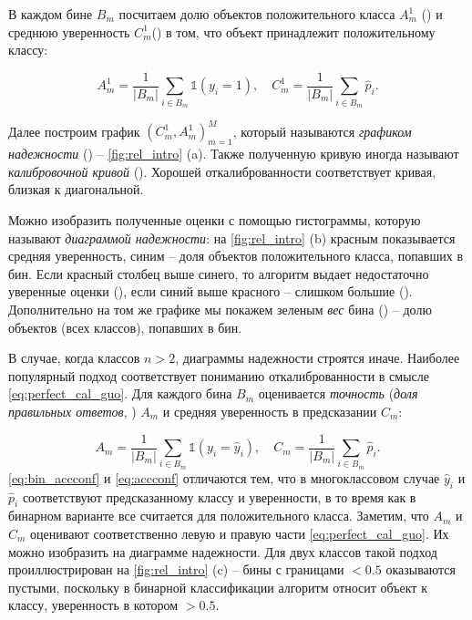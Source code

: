 \documentclass[12pt]{article}
\begin{document}
В каждом бине $B_m$ посчитаем долю объектов положительного класса $A^1_m$ () и среднюю уверенность $C^1_m$() в том, что объект принадлежит положительному классу:

\begin{equation}\label{eq:bin_accconf}
    A^1_m=\frac{1}{|B_m|}\sum_{i\in B_m} \mathbb{1}(y_i=1),
    \quad
    C^1_m=\frac{1}{|B_m|}\sum_{i\in B_m} \hat{p}_i.
\end{equation}

Далее построим график $(C^1_m, A^1_m)_{m=1}^M$, который называются \emph{графиком надежности} \cite{reldiag_idea, good_proba} () -- \autoref{fig:rel_intro} (a). Также полученную кривую иногда называют \emph{калибровочной кривой} (). Хорошей откалиброванности соответствует кривая, близкая к диагональной. 

Можно изобразить полученные оценки с помощью гистограммы, которую называют \emph{диаграммой надежности}: на \autoref{fig:rel_intro} (b) красным показывается средняя уверенность, синим -- доля объектов положительного класса, попавших в бин. Если красный столбец выше синего, то алгоритм выдает недостаточно уверенные оценки (), если синий выше красного -- слишком большие (). Дополнительно на том же графике мы покажем зеленым \emph{вес} бина () -- долю объектов (всех классов), попавших в бин. 

В случае, когда классов $n>2$, диаграммы надежности строятся иначе. Наиболее популярный подход соответствует пониманию откалиброванности в смысле \eqref{eq:perfect_cal_guo}. Для каждого бина $B_m$ оценивается \emph{точность} (\emph{доля правильных ответов}, ) $A_m$ и средняя уверенность в предсказании $C_m$:

\begin{equation}\label{eq:accconf}
    A_m=\frac{1}{|B_m|}\sum_{i\in B_m} \mathbb{1}(y_i=\hat{y}_i),
    \quad
    C_m=\frac{1}{|B_m|}\sum_{i\in B_m} \hat{p}_i.
\end{equation}
\eqref{eq:bin_accconf} и \eqref{eq:accconf} отличаются тем, что в многоклассовом случае $\hat{y}_i$ и $\hat{p}_i$ соответствуют предсказанному классу и уверенности, в то время как в бинарном варианте все считается для положительного класса.
Заметим, что $A_m$ и $C_m$ оценивают соответственно левую и правую части \eqref{eq:perfect_cal_guo}. Их можно изобразить на диаграмме надежности. Для двух классов такой подход проиллюстрирован на \autoref{fig:rel_intro} (c) -- бины с границами $<0.5$ оказываются пустыми, поскольку в бинарной классификации алгоритм относит объект к классу, уверенность в котором $>0.5$.
\end{document}
